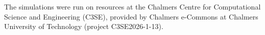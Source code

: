 The simulations were run on resources at the Chalmers Centre for Computational Science and Engineering (C3SE), provided by Chalmers e-Commons at Chalmers University of Technology (project C3SE2026-1-13).
